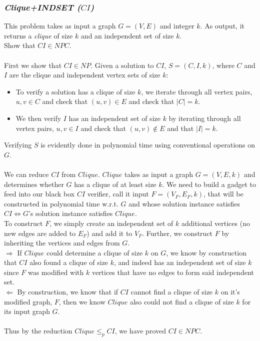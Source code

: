 \documentclass{article}
\theoremstyle{definition}
\begin{document}
\subsubsection{\textit{Clique+INDSET ($CI$)}}
This problem takes as input a graph $G = (V,E)$ and integer $k$. As output, it returns a \textit{clique} of size $k$ and an independent set of size $k$. \\Show that $CI \in NPC$.\\\\
First we show that $CI \in NP$. Given a solution to $CI$, $S = (C, I, k)$, where $C$ and $I$ are the clique and independent vertex sets of size $k$:

\begin{itemize}
	\item To verify a solution has a clique of size $k$, we iterate through all vertex pairs, $u, v \in C$ and check that $(u,v) \in E$ and check that $|C| = k$. 
	\item We then verify $I$ has an independent set of size $k$ by iterating through all vertex pairs, $u, v \in I$ and check that $(u,v) \notin E$ and that $|I| = k$. 
\end{itemize}

Verifying $S$ is evidently done in polynomial time using conventional operations on $G$. \\\\
We can reduce $CI$ from $Clique$. $Clique$ takes as input a graph $G = (V,E, k)$ and determines whether $G$ has a clique of at least size $k$. We need to build a gadget to feed into our black box $CI$ verifier, call it input $F = (V_F, E_F, k)$, that will be constructed in polynomial time w.r.t. $G$ and whose solution instance satisfies $CI \iff G$'s solution instance satisfies $Clique$.\\
To construct $F$, we simply create an independent set of $k$ additional vertices (no new edges are added to $E_F$) and add it to $V_F$. Further, we construct $F$ by inheriting the vertices and edges from $G$.\\
$\Rightarrow$ If $Clique$ could determine a clique of size $k$ on $G$, we know by construction that $CI$ also found a clique of size $k$, and indeed has an independent set of size $k$ since $F$ was modified with $k$ vertices that have no edges to form said independent set.\\
$\Leftarrow$ By construction, we know that if $CI$ cannot find a clique of size $k$ on it's modified graph, $F$, then we know $Clique$ also could not find a clique of size $k$ for its input graph $G$.\\\\
Thus by the reduction $Clique \leq_p CI$, we have proved $CI \in NPC$.
\end{document}
